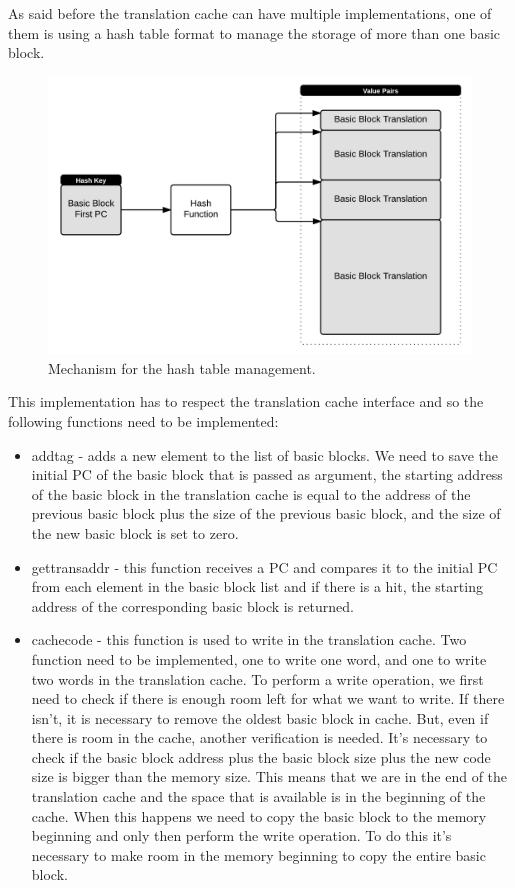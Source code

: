 As said before the translation cache can have multiple implementations, one of them is using a hash table format to manage the storage of more than one basic block. 

\begin{figure} [h!]
	\centering
	\includegraphics[scale = 0.2]{Images/Hash.png}
	\caption{Mechanism for the hash table management.}
	\label{fig:Hash}
\end{figure}

This implementation has to respect the translation cache interface and so the following functions need to be implemented:
\begin{itemize}
	\item addtag - adds a new element to the list of basic blocks. We need to save the initial PC of the basic block that is passed as argument, the starting address of the basic block in the translation cache is equal to the address of the previous basic block plus the size of the previous basic block, and the size of the new basic block is set to zero.
	\item gettransaddr - this function receives a PC and compares it to the initial PC from each element in the basic block list and if there is a hit, the starting address of the corresponding basic block is returned.
	\item cachecode - this function is used to write in the translation cache. Two function need to be implemented, one to write one word, and one to write two words in the translation cache. To perform a write operation, we first need to check if there is enough room left for what we want to write. If there isn't, it is necessary to remove the oldest basic block in cache. But, even if there is room in the cache, another verification is needed. It's necessary to check if the basic block address plus the basic block size plus the new code size is bigger than the memory size. This means that we are in the end of the translation cache and the space that is available is in the beginning of the cache. When this happens we need to copy the basic block to the memory beginning and only then perform the write operation. To do this it's necessary to make room in the memory beginning to copy the entire basic block.
\end{itemize}

